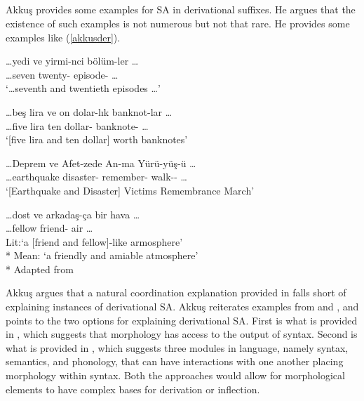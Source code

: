 \subsection{\citet{akkucs2016suspended}}

Akkuş provides some examples for SA in derivational suffixes. He argues that the existence of such examples is not numerous but not that rare. He provides some examples like (\ref{akkusder}).

\begin{exe}
\ex \label{akkusder}
\begin{xlist}
    \ex \gll \ldots yedi ve yirmi-nci bölüm-ler \ldots \\ 
    \ldots seven {\And} twenty-{\Der} episode-{\Pl} \ldots \\
    \glt `\ldots seventh and twentieth episodes \ldots'
    
    \ex \gll \ldots beş lira ve on dolar-lık banknot-lar \ldots \\
    \ldots five lira {\And} ten dollar-{\Der} banknote-{\Pl} \ldots \\
    \glt `[five lira and ten dollar] worth banknotes'
    
    \ex \gll \ldots Deprem ve Afet-zede An-ma Yürü-yüş-ü \ldots \\ 
    \ldots earthquake {\And} disaster-{\Der} remember-{\Nmlz} walk-{\Nmlz}-{\Acc} \ldots \\ 
    \glt `[Earthquake and Disaster] Victims Remembrance March'
    
    \ex \gll \ldots dost ve arkadaş-ça bir hava \ldots \\ 
    \ldots fellow {\And} friend-{\Der} {\Det} air \ldots \\
    \glt Lit:`a [friend and fellow]-like armosphere' \\*
    Mean: `a friendly and amiable atmosphere'\\*
    \hfill Adapted from \citet{akkucs2016suspended}
\end{xlist}
\end{exe}

Akkuş argues that a natural coordination explanation \citep{walchli2005co} provided in \citet{kabak2007turkish} falls short of explaining instances of derivational SA. Akkuş reiterates examples from \citet{ackema2004beyond} and \citet{lieber2006lexical}, and points to the two options for explaining derivational SA. First is what is provided in \citet{lieber2006lexical}, which suggests that morphology has access to the output of syntax. Second is what is provided in \citet{ackema2004beyond}, which suggests three modules in language, namely syntax, semantics, and phonology, that can have interactions with one another placing morphology within syntax. Both the approaches would allow for morphological elements to have complex bases for derivation or inflection.
